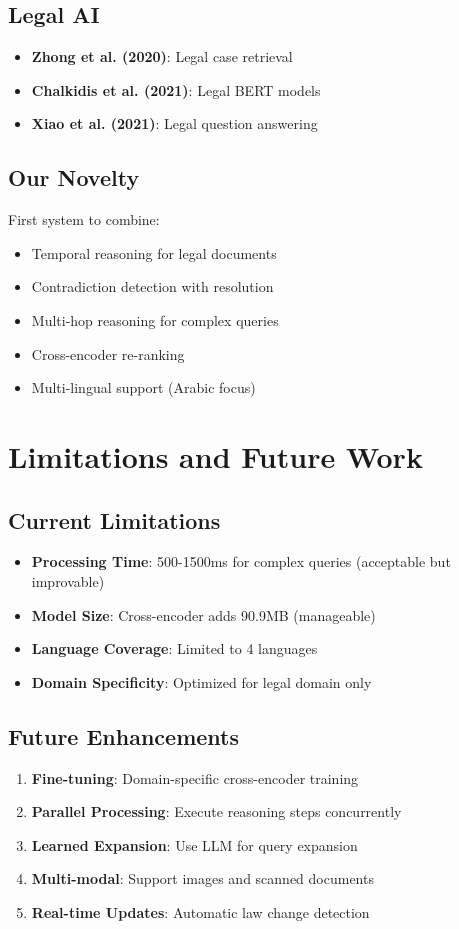 \documentclass[12pt,a4paper]{article}
\begin{document}
\subsection{Legal AI}
\begin{itemize}
    \item \textbf{Zhong et al. (2020)}: Legal case retrieval
    \item \textbf{Chalkidis et al. (2021)}: Legal BERT models
    \item \textbf{Xiao et al. (2021)}: Legal question answering
\end{itemize}

\subsection{Our Novelty}
First system to combine:
\begin{itemize}
    \item Temporal reasoning for legal documents
    \item Contradiction detection with resolution
    \item Multi-hop reasoning for complex queries
    \item Cross-encoder re-ranking
    \item Multi-lingual support (Arabic focus)
\end{itemize}


\section{Limitations and Future Work}

\subsection{Current Limitations}
\begin{itemize}
    \item \textbf{Processing Time}: 500-1500ms for complex queries (acceptable but improvable)
    \item \textbf{Model Size}: Cross-encoder adds 90.9MB (manageable)
    \item \textbf{Language Coverage}: Limited to 4 languages
    \item \textbf{Domain Specificity}: Optimized for legal domain only
\end{itemize}

\subsection{Future Enhancements}
\begin{enumerate}
    \item \textbf{Fine-tuning}: Domain-specific cross-encoder training
    \item \textbf{Parallel Processing}: Execute reasoning steps concurrently
    \item \textbf{Learned Expansion}: Use LLM for query expansion
    \item \textbf{Multi-modal}: Support images and scanned documents
    \item \textbf{Real-time Updates}: Automatic law change detection
\end{enumerate}
\end{document}
